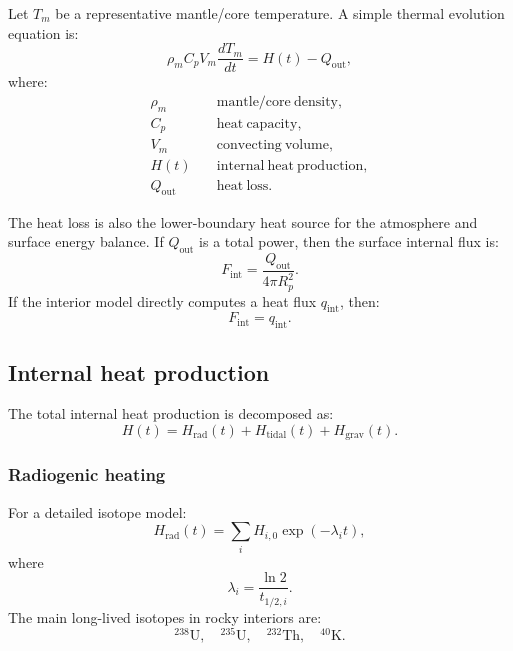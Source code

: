 \documentclass[11pt]{article}
\begin{document}
Let $T_m$ be a representative mantle/core temperature. A simple thermal
evolution equation is:
\begin{equation}
    \rho_m C_p V_m \frac{dT_m}{dt}
    =
    H(t) - Q_{\mathrm{out}},
\end{equation}
where:
\begin{align}
    \rho_m &\quad \mathrm{mantle/core\ density}, \\
    C_p &\quad \mathrm{heat\ capacity}, \\
    V_m &\quad \mathrm{convecting\ volume}, \\
    H(t) &\quad \mathrm{internal\ heat\ production}, \\
    Q_{\mathrm{out}} &\quad \mathrm{heat\ loss}.
\end{align}

The heat loss is also the lower-boundary heat source for the atmosphere and
surface energy balance. If $Q_{\mathrm{out}}$ is a total power, then the
surface internal flux is:
\begin{equation}
    F_{\mathrm{int}}
    =
    \frac{Q_{\mathrm{out}}}{4\pi R_p^2}.
\end{equation}
If the interior model directly computes a heat flux $q_{\mathrm{int}}$, then:
\begin{equation}
    F_{\mathrm{int}} = q_{\mathrm{int}}.
\end{equation}

\subsection{Internal heat production}

The total internal heat production is decomposed as:
\begin{equation}
    H(t)
    =
    H_{\mathrm{rad}}(t)
    +
    H_{\mathrm{tidal}}(t)
    +
    H_{\mathrm{grav}}(t).
\end{equation}

\subsubsection{Radiogenic heating}

For a detailed isotope model:
\begin{equation}
    H_{\mathrm{rad}}(t)
    =
    \sum_i H_{i,0}\exp(-\lambda_i t),
\end{equation}
where
\begin{equation}
    \lambda_i = \frac{\ln 2}{t_{1/2,i}}.
\end{equation}
The main long-lived isotopes in rocky interiors are:
\begin{equation}
    ^{238}\mathrm{U},\quad
    ^{235}\mathrm{U},\quad
    ^{232}\mathrm{Th},\quad
    ^{40}\mathrm{K}.
\end{equation}
\end{document}
